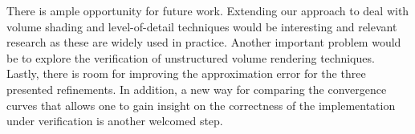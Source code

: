 There is ample opportunity for future work. Extending our approach to
deal with volume shading and level-of-detail techniques would be
interesting and relevant research as these are widely used in
practice. Another important problem would be to explore the
verification of unstructured volume rendering techniques. Lastly,
there is room for improving the approximation error for
the three presented refinements. In addition, a new way for comparing
the convergence curves that allows one to gain insight on the
correctness of the implementation under verification is another
welcomed step.

